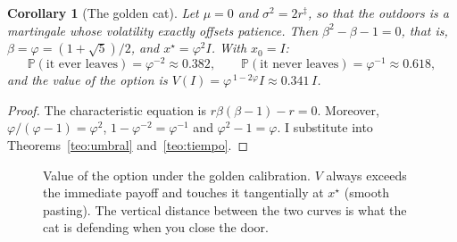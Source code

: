 \documentclass[11pt,a4paper]{article}
\theoremstyle{plain}
\newtheorem{corolario}[teorema]{Corollary}
\theoremstyle{definition}
\theoremstyle{remark}
\numberwithin{equation}{section}
\renewcommand{\P}{\mathbb{P}}
\newcommand{\calib}{{\ensuremath{^{\ddagger}}}}
\begin{document}
\begin{corolario}[The golden cat]\label{cor:aureo}
Let $\mu=0$ and $\sigma^2=2r$\calib, so that the outdoors is a martingale whose volatility exactly offsets patience. Then $\beta^2-\beta-1=0$, that is, $\beta=\varphi=(1+\sqrt5)/2$, and $x^\star=\varphi^2I$. With $x_0=I$:
\begin{equation}
  \P(\text{it ever leaves})=\varphi^{-2}\approx 0.382,
  \qquad
  \P(\text{it never leaves})=\varphi^{-1}\approx 0.618,
\end{equation}
and the value of the option is $V(I)=\varphi^{\,1-2\varphi}I\approx 0.341\,I$.
\end{corolario}

\begin{proof}
The characteristic equation is $r\beta(\beta-1)-r=0$. Moreover, $\varphi/(\varphi-1)=\varphi^2$, $1-\varphi^{-2}=\varphi^{-1}$ and $\varphi^2-1=\varphi$. I substitute into Theorems~\ref{teo:umbral} and~\ref{teo:tiempo}.
\end{proof}

\begin{figure}[ht]
\centering
{}
\caption{Value of the option under the golden calibration. $V$ always exceeds the immediate payoff and touches it tangentially at $x^\star$ (smooth pasting). The vertical distance between the two curves is what the cat is defending when you close the door.}\label{fig:puerta}
\end{figure}
\end{document}
